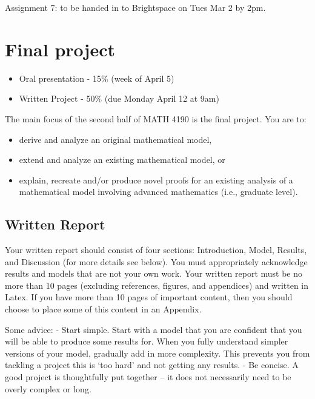 \documentclass[]{book}
\providecommand{\tightlist}{%
  \setlength{\itemsep}{0pt}\setlength{\parskip}{0pt}}
\begin{document}
Assignment 7: to be handed in to Brightspace on Tues Mar 2 by 2pm.

\chapter{Final project}\label{final-project}

\begin{itemize}
\tightlist
\item
  Oral presentation - 15\% (week of April 5)
\item
  Written Project - 50\% (due Monday April 12 at 9am)
\end{itemize}

The main focus of the second half of MATH 4190 is the final project. You
are to:

\begin{itemize}
\tightlist
\item
  derive and analyze an original mathematical model,
\item
  extend and analyze an existing mathematical model, or
\item
  explain, recreate and/or produce novel proofs for an existing analysis
  of a mathematical model involving advanced mathematics (i.e., graduate
  level).
\end{itemize}

\section{Written Report}\label{written-report}

Your written report should consist of four sections: Introduction,
Model, Results, and Discussion (for more details see below). You must
appropriately acknowledge results and models that are not your own work.
Your written report must be no more than 10 pages (excluding references,
figures, and appendices) and written in Latex. If you have more than 10
pages of important content, then you should choose to place some of this
content in an Appendix.

Some advice: - Start simple. Start with a model that you are confident
that you will be able to produce some results for. When you fully
understand simpler versions of your model, gradually add in more
complexity. This prevents you from tackling a project this is `too hard'
and not getting any results. - Be concise. A good project is
thoughtfully put together -- it does not necessarily need to be overly
complex or long.
\end{document}
